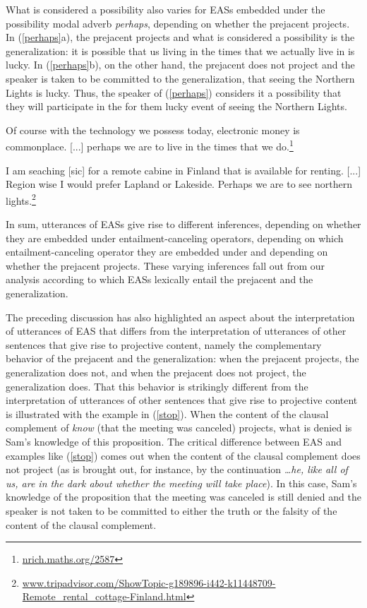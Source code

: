 \documentclass[11pt,fleqn]{article}
\newcommand{\6}{\mbox{$[\hspace*{-.6mm}[$}}
\newcommand{\9}{\mbox{$]\hspace*{-.6mm}]$}}
\begin{document}
What is considered a possibility also varies for EASs embedded under the possibility modal adverb {\em perhaps}, depending on whether the prejacent projects. In (\ref{perhaps}a), the prejacent projects and what is considered a possibility is the generalization: it is possible that us living in the times that we actually live in is lucky. In (\ref{perhaps}b), on the other hand, the prejacent does not project and the speaker is taken to be committed to the generalization, that seeing the Northern Lights is lucky. Thus, the speaker of (\ref{perhaps}) considers it a possibility that they will participate in the for them lucky event of seeing the Northern Lights. 

\begin{exe}
\ex\label{perhaps}

\begin{xlist}

\ex Of course with the technology we possess today, electronic money is commonplace. [...] perhaps we are  to live in the times that we do.\footnote{\url{nrich.maths.org/2587}}

\ex I am seaching [sic] for a remote cabine in Finland that is available for renting. [...]
Region wise I would prefer Lapland or Lakeside. Perhaps we are  to see northern lights.\footnote{\url{www.tripadvisor.com/ShowTopic-g189896-i442-k11448709-Remote_rental_cottage-Finland.html}}

\end{xlist}

\end{exe}
In sum, utterances of EASs give rise to different inferences, depending on whether they are embedded under entailment-canceling operators, depending on which entailment-canceling operator they are embedded under and depending on whether the prejacent projects. These varying inferences fall out from our analysis according to which EASs lexically entail the prejacent and the generalization. 

The preceding discussion has also highlighted an aspect about the interpretation of utterances of EAS that differs from the interpretation of utterances of other sentences that give rise to projective content, namely the complementary behavior of the prejacent and the generalization: when the prejacent projects, the generalization does not, and when the prejacent does not project, the generalization does. That this behavior is strikingly different from the interpretation of utterances of other sentences that give rise to projective content is illustrated with the example in (\ref{stop}). When the content of the clausal complement of {\em know} (that the meeting was canceled) projects, what is denied is Sam's knowledge of this proposition. The critical difference between EAS and examples like (\ref{stop}) comes out when the content of the clausal complement does not project (as is brought out, for instance, by the continuation {\em \ldots he, like all of us, are in the dark about whether the meeting will take place}). In this case, Sam's knowledge of the proposition that the meeting was canceled is still denied and the speaker is not taken to be committed to either the truth or the falsity of the content of the clausal complement. 
\end{document}
